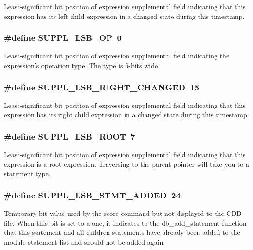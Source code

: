 Least-significant bit position of expression supplemental field indicating that this expression has its left child expression in a changed state during this timestamp. 
\subsubsection{\setlength{\rightskip}{0pt plus 5cm}\#define SUPPL\_\-LSB\_\-OP\ 0}\label{group__expr__suppl_a0}


Least-significant bit position of expression supplemental field indicating the expression's operation type. The type is 6-bits wide. 
\subsubsection{\setlength{\rightskip}{0pt plus 5cm}\#define SUPPL\_\-LSB\_\-RIGHT\_\-CHANGED\ 15}\label{group__expr__suppl_a10}


Least-significant bit position of expression supplemental field indicating that this expression has its right child expression in a changed state during this timestamp. 
\subsubsection{\setlength{\rightskip}{0pt plus 5cm}\#define SUPPL\_\-LSB\_\-ROOT\ 7}\label{group__expr__suppl_a2}


Least-significant bit position of expression supplemental field indicating that this expression is a root expression. Traversing to the parent pointer will take you to a statement type. 
\subsubsection{\setlength{\rightskip}{0pt plus 5cm}\#define SUPPL\_\-LSB\_\-STMT\_\-ADDED\ 24}\label{group__expr__suppl_a19}


Temporary bit value used by the score command but not displayed to the CDD file. When this bit is set to a one, it indicates to the db\_\-add\_\-statement function that this statement and all children statements have already been added to the module statement list and should not be added again. 
